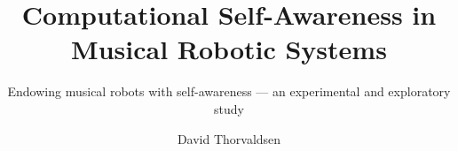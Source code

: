 \title{Computational Self-Awareness in Musical Robotic Systems} %
\subtitle{Endowing musical robots with self-awareness — an experimental and exploratory study} %
\author{David Thorvaldsen}
\duoforside[dept={Institute for Informatics}, program={Informatics: Robotics and Intelligent Systems}, long]



\newpage


\newpage

\tableofcontents
\newpage

\listoftables
\newpage

\listoffigures
\newpage\phantom{jadajadajada}
\newpage



\setcounter{page}{1}